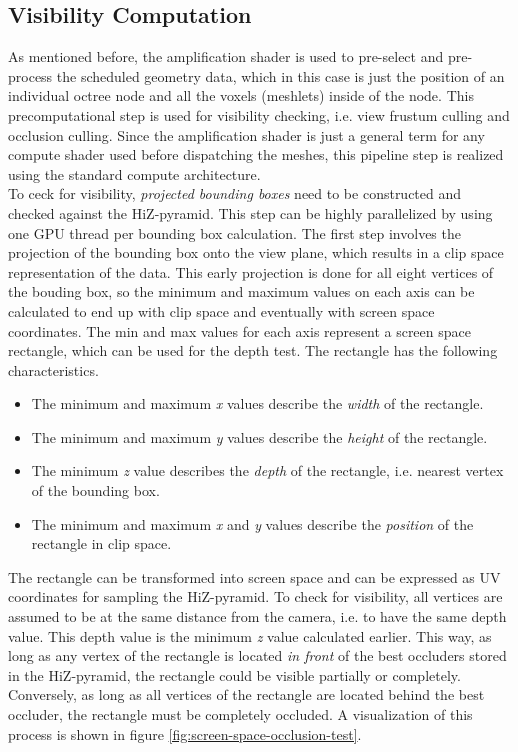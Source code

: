 \subsection*{Visibility Computation} \label{subsec-visibility-computation}

As mentioned before, the amplification shader is used to pre-select and pre-process the scheduled geometry data, 
which in this case is just the position of an individual octree node and all the voxels (meshlets) inside of the 
node. This precomputational step is used for visibility checking, i.e. view frustum culling and occlusion culling. 
Since the amplification shader is just a general term for any compute shader used before dispatching the meshes, 
this pipeline step is realized using the standard compute architecture. \\

\noindent
To ceck for visibility, \emph{projected bounding boxes} need to be constructed and checked against the 
\ac{HiZ}-pyramid. This step can be highly parallelized by using one \ac{GPU} thread per bounding box calculation. 
The first step involves the projection of the bounding box onto the view plane, which results in a clip space 
representation of the data. This early projection is done for all eight vertices of the bouding box, so the minimum 
and maximum values on each axis can be calculated to end up with clip space and eventually with screen space coordinates.
The min and max values for each axis represent a screen space rectangle, which can be used for the depth test. The 
rectangle has the following characteristics.

\begin{itemize}
    \item The minimum and maximum \emph{x} values describe the \emph{width} of the rectangle.
    \item The minimum and maximum \emph{y} values describe the \emph{height} of the rectangle.
    \item The minimum \emph{z} value describes the \emph{depth} of the rectangle, i.e. nearest vertex of the bounding box.
    \item The minimum and maximum \emph{x} and \emph{y} values describe the \emph{position} of the rectangle in clip space.
\end{itemize}

The rectangle can be transformed into screen space and can be expressed as UV coordinates for sampling the 
\ac{HiZ}-pyramid. To check for visibility, all vertices are assumed to be at the same distance from the camera,
i.e. to have the same depth value. This depth value is the minimum \emph{z} value calculated earlier. This way,
as long as any vertex of the rectangle is located \emph{in front} of the best occluders stored in the 
\ac{HiZ}-pyramid, the rectangle could be visible partially or completely. Conversely, as long as all vertices of 
the rectangle are located behind the best occluder, the rectangle must be completely occluded. A visualization of 
this process is shown in figure \ref{fig:screen-space-occlusion-test}.

